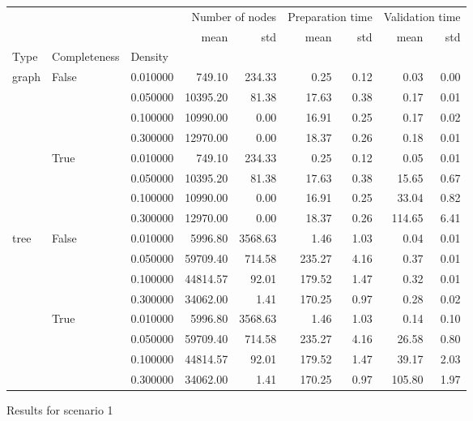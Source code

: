 \begin{figure}
    \begin{tabular}{lllrrrrrr}
        &  &  & \multicolumn{2}{r}{Number of nodes} & \multicolumn{2}{r}{Preparation time} & \multicolumn{2}{r}{Validation time} \\
        &  &  & mean & std & mean & std & mean & std \\
       Type & Completeness & Density &  &  &  &  &  &  \\
       \multirow[c]{8}{*}{graph} & \multirow[c]{4}{*}{False} & 0.010000 & 749.10 & 234.33 & 0.25 & 0.12 & 0.03 & 0.00 \\
        &  & 0.050000 & 10395.20 & 81.38 & 17.63 & 0.38 & 0.17 & 0.01 \\
        &  & 0.100000 & 10990.00 & 0.00 & 16.91 & 0.25 & 0.17 & 0.02 \\
        &  & 0.300000 & 12970.00 & 0.00 & 18.37 & 0.26 & 0.18 & 0.01 \\
        & \multirow[c]{4}{*}{True} & 0.010000 & 749.10 & 234.33 & 0.25 & 0.12 & 0.05 & 0.01 \\
        &  & 0.050000 & 10395.20 & 81.38 & 17.63 & 0.38 & 15.65 & 0.67 \\
        &  & 0.100000 & 10990.00 & 0.00 & 16.91 & 0.25 & 33.04 & 0.82 \\
        &  & 0.300000 & 12970.00 & 0.00 & 18.37 & 0.26 & 114.65 & 6.41 \\
       \multirow[c]{8}{*}{tree} & \multirow[c]{4}{*}{False} & 0.010000 & 5996.80 & 3568.63 & 1.46 & 1.03 & 0.04 & 0.01 \\
        &  & 0.050000 & 59709.40 & 714.58 & 235.27 & 4.16 & 0.37 & 0.01 \\
        &  & 0.100000 & 44814.57 & 92.01 & 179.52 & 1.47 & 0.32 & 0.01 \\
        &  & 0.300000 & 34062.00 & 1.41 & 170.25 & 0.97 & 0.28 & 0.02 \\
        & \multirow[c]{4}{*}{True} & 0.010000 & 5996.80 & 3568.63 & 1.46 & 1.03 & 0.14 & 0.10 \\
        &  & 0.050000 & 59709.40 & 714.58 & 235.27 & 4.16 & 26.58 & 0.80 \\
        &  & 0.100000 & 44814.57 & 92.01 & 179.52 & 1.47 & 39.17 & 2.03 \\
        &  & 0.300000 & 34062.00 & 1.41 & 170.25 & 0.97 & 105.80 & 1.97 \\
       \end{tabular}
\caption{Results for scenario 1}       
\end{figure}